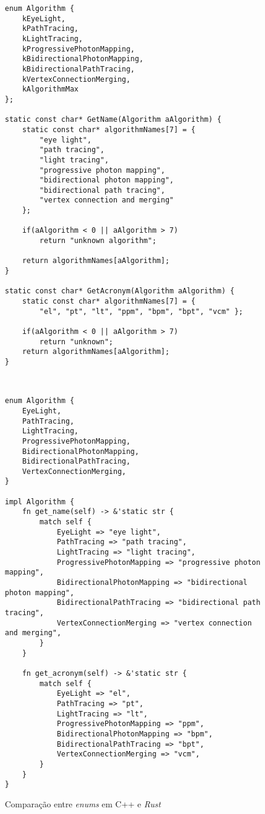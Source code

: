 \documentclass[tg]{mdtufsm}
\begin{document}
\begin{figure}
	\centering
	\begin{minipage}[t]{0.48\textwidth}
\begin{lstlisting}
enum Algorithm {
	kEyeLight,
	kPathTracing,
	kLightTracing,
	kProgressivePhotonMapping,
	kBidirectionalPhotonMapping,
	kBidirectionalPathTracing,
	kVertexConnectionMerging,
	kAlgorithmMax
};

static const char* GetName(Algorithm aAlgorithm) {
	static const char* algorithmNames[7] = {
		"eye light",
		"path tracing",
		"light tracing",
		"progressive photon mapping",
		"bidirectional photon mapping",
		"bidirectional path tracing",
		"vertex connection and merging"
	};

	if(aAlgorithm < 0 || aAlgorithm > 7)
		return "unknown algorithm";

	return algorithmNames[aAlgorithm];
}

static const char* GetAcronym(Algorithm aAlgorithm) {
	static const char* algorithmNames[7] = {
		"el", "pt", "lt", "ppm", "bpm", "bpt", "vcm" };

	if(aAlgorithm < 0 || aAlgorithm > 7)
		return "unknown";
	return algorithmNames[aAlgorithm];
}
\end{lstlisting}
	\end{minipage}
	~
	\begin{minipage}[t]{0.48\textwidth}
\begin{lstlisting}
enum Algorithm {
	EyeLight,
	PathTracing,
	LightTracing,
	ProgressivePhotonMapping,
	BidirectionalPhotonMapping,
	BidirectionalPathTracing,
	VertexConnectionMerging,
}

impl Algorithm {
	fn get_name(self) -> &'static str {
		match self {
			EyeLight => "eye light",
			PathTracing => "path tracing",
			LightTracing => "light tracing",
			ProgressivePhotonMapping => "progressive photon mapping",
			BidirectionalPhotonMapping => "bidirectional photon mapping",
			BidirectionalPathTracing => "bidirectional path tracing",
			VertexConnectionMerging => "vertex connection and merging",
		}
	}

	fn get_acronym(self) -> &'static str {
		match self {
			EyeLight => "el",
			PathTracing => "pt",
			LightTracing => "lt",
			ProgressivePhotonMapping => "ppm",
			BidirectionalPhotonMapping => "bpm",
			BidirectionalPathTracing => "bpt",
			VertexConnectionMerging => "vcm",
		}
	}
}
\end{lstlisting}
	\end{minipage}
	\caption{Comparação entre \emph{enums} em C++ e \emph{Rust}}
	\label{code:enums}
\end{figure}
\end{document}
